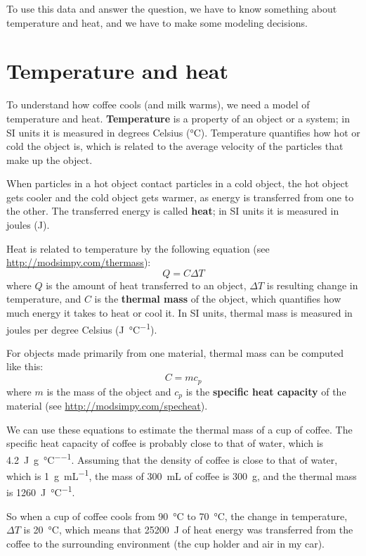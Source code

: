 \documentclass[12pt]{book}
\theoremstyle{exercise}
\begin{document}
To use this data and answer the question, we have to know something about temperature and heat, and we have to make some modeling decisions.

\section{Temperature and heat}

To understand how coffee cools (and milk warms), we need a model of temperature and heat.  {\bf Temperature} is a property of an object or a system; in SI units it is measured in degrees Celsius (\si{\celsius}).  Temperature quantifies how hot or cold the object is, which is related to the average velocity of the particles that make up the object.

When particles in a hot object contact particles in a cold object, the hot object gets cooler and the cold object gets warmer, as energy is transferred from one to the other.  The transferred energy is called {\bf heat}; in SI units it is measured in joules (\si{\joule}).

Heat is related to temperature by the following equation (see \url{http://modsimpy.com/thermass}):
%
\[ Q = C \Delta T \]
%
where $Q$ is the amount of heat transferred to an object, $\Delta T$ is resulting change in temperature, and $C$ is the {\bf thermal mass} of the object, which quantifies how much energy it takes to heat or cool it.  In SI units, thermal mass is measured in joules per degree Celsius (\si{\joule\per\celsius}).

For objects made primarily from one material, thermal mass can be computed like this:
%
\[ C = m c_p \]
%
where $m$ is the mass of the object and $c_p$ is the {\bf specific heat capacity} of the material (see \url{http://modsimpy.com/specheat}).

We can use these equations to estimate the thermal mass of a cup of coffee.  The specific heat capacity of coffee is probably close to that of water, which is \SI{4.2}{\joule\per\gram\per\celsius}.  Assuming that the density of coffee is close to that of water, which is \SI{1}{\gram\per\milli\liter}, the mass of \SI{300}{\milli\liter} of coffee is \SI{300}{\gram}, and the thermal mass is \SI{1260}{\joule\per\celsius}.

So when a cup of coffee cools from \SI{90}{\celsius} to \SI{70}{\celsius}, the change in temperature, $\Delta T$ is \SI{20}{\celsius}, which means that \SI{25200}{\joule} of heat energy was transferred from the coffee to the surrounding environment (the cup holder and air in my car).
\end{document}
